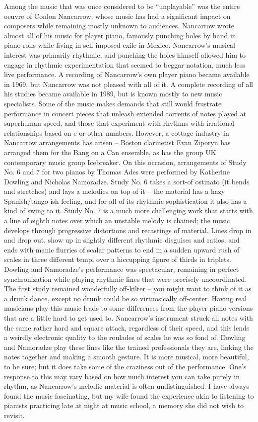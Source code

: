 Among the music that was once considered to be “unplayable” was the entire oeuvre of Conlon Nancarrow, whose music has had a significant impact on composers while remaining mostly unknown to audiences. Nancarrow wrote almost all of his music for player piano, famously punching holes by hand in piano rolls while living in self-imposed exile in Mexico. Nancarrow’s musical interest was primarily rhythmic, and punching the holes himself allowed him to engage in rhythmic experimentation that seemed to beggar notation, much less live performance. A recording of Nancarrow’s own player piano became available in 1969, but Nancarrow was not pleased with all of it. A complete recording of all his studies became available in 1989, but is known mostly to new music specialists. Some of the music makes demands that still would frustrate performance in concert pieces that unleash extended torrents of notes played at superhuman speed, and those that experiment with rhythms with irrational relationships based on e or other numbers. However, a cottage industry in Nancarrow arrangements has arisen – Boston clarinetist Evan Ziporyn has arranged them for the Bang on a Can ensemble, as has the group UK contemporary music group Icebreaker. On this occasion, arrangements of Study No. 6 and 7 for two pianos by Thomas Ades were performed by Katherine Dowling and Nicholas Namoradze. Study No. 6 takes a sort-of ostinato (it bends and stretches) and lays a melodies on top of it – the material has a hazy Spanish/tango-ish feeling, and for all of its rhythmic sophistication it also has a kind of swing to it. Study No. 7 is a much more challenging work that starts with a line of eighth notes over which an unstable melody is chained; the music develops through progressive distortions and recastings of material. Lines drop in and drop out, show up in slightly different rhythmic disguises and ratios, and ends with manic flurries of scalar patterns to end in a sudden upward rush of scales in three different tempi over a hiccupping figure of thirds in triplets. Dowling and Namoradze’s performance was spectacular, remaining in perfect synchronization while playing rhythmic lines that were precisely uncoordinated. The first study remained wonderfully off-kilter – you might want to think of it as a drunk dance, except no drunk could be so virtuosically off-center. Having real musicians play this music leads to some differences from the player piano versions that are a little hard to get used to. Nancarrow’s instrument struck all notes with the same rather hard and square attack, regardless of their speed, and this lends a weirdly electronic quality to the roulades of scales he was so fond of. Dowling and Namoradze play these lines like the trained professionals they are, linking the notes together and making a smooth gesture. It is more musical, more beautiful, to be sure; but it does take some of the craziness out of the performance. One’s response to this may vary based on how much interest you can take purely in rhythm, as Nancarrow’s melodic material is often undistinguished. I have always found the music fascinating, but my wife found the experience akin to listening to pianists practicing late at night at music school, a memory she did not wish to revisit.

